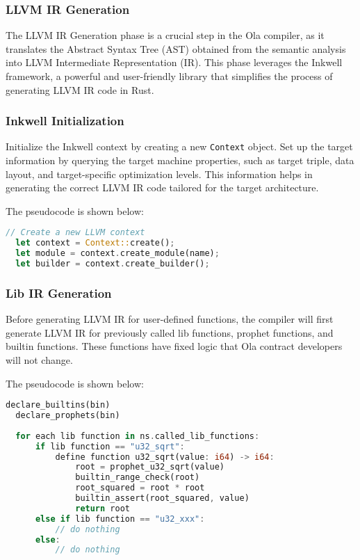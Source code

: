 \subsubsection{LLVM IR Generation}

The LLVM IR Generation phase is a crucial step in the Ola compiler, as it translates the Abstract Syntax Tree (AST) obtained from the semantic analysis into LLVM Intermediate Representation (IR). This phase leverages the Inkwell framework, a powerful and user-friendly library that simplifies the process of generating LLVM IR code in Rust.

\subsubsection*{Inkwell Initialization}

Initialize the Inkwell context by creating a new \texttt{Context} object. Set up the target information by querying the target machine properties, such as target triple, data layout, and target-specific optimization levels. This information helps in generating the correct LLVM IR code tailored for the target architecture.

The pseudocode is shown below:

\begin{lstlisting}[language=Rust]
  // Create a new LLVM context
  let context = Context::create();
  let module = context.create_module(name);
  let builder = context.create_builder();
\end{lstlisting}
\subsubsection*{Lib IR Generation}

Before generating LLVM IR for user-defined functions, the compiler will first generate LLVM IR for previously called lib functions, prophet functions, and builtin functions. These functions have fixed logic that Ola contract developers will not change.

The pseudocode is shown below:

\begin{lstlisting}[language=Rust]
  declare_builtins(bin)
  declare_prophets(bin)
  
  for each lib function in ns.called_lib_functions:
      if lib function == "u32_sqrt":
          define function u32_sqrt(value: i64) -> i64:
              root = prophet_u32_sqrt(value)
              builtin_range_check(root)
              root_squared = root * root
              builtin_assert(root_squared, value)
              return root
      else if lib function == "u32_xxx":
          // do nothing
      else:
          // do nothing
  
\end{lstlisting}
